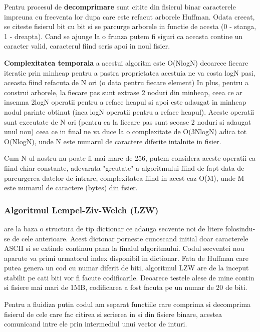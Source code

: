 \documentclass[runningheads]{llncs}
\begin{document}
Pentru procesul de \textbf{decomprimare} sunt citite din fisierul binar caracterele impreuna cu frecventa lor dupa care este refacut arborele
Huffman. Odata creeat, se citeste fisierul bit cu bit si se parcurge arborele in functie de acesta (0 - stanga, 1 - dreapta).
Cand se ajunge la o frunza putem fi siguri ca aceasta contine un caracter valid, caracterul fiind scris apoi in noul fisier.

\textbf{Complexitatea temporala} a acestui algoritm este O(NlogN) deoarece fiecare iteratie prin minheap pentru a pastra proprietatea
acestuia ne va costa logN pasi, aceasta fiind refacuta de N ori (o data pentru fiecare element)
In plus, pentru a construi arborele, la fiecare pas sunt extrase 2 noduri din minheap, ceea ce ar insemna 2logN operatii pentru a reface heapul
si apoi este adaugat in minheap nodul parinte obtinut (inca logN operatii pentru a reface heapul). Aceste operatii sunt executate de N ori (pentru
ca la fiecare pas sunt scoase 2 noduri si adaugat unul nou) ceea ce in final ne va duce la o complexitate de O(3NlogN) adica tot O(NlogN), unde
N este numarul de caractere diferite intalnite in fisier.

Cum N-ul nostru nu poate fi mai mare de 256, putem considera aceste operatii ca fiind chiar constante, adevarata "greutate" a algoritmului fiind de fapt
data de parcurgerea datelor de intrare, complexitatea fiind in acest caz O(M), unde M este numarul de caractere (bytes) din fisier.

\subsubsection{Algoritmul Lempel-Ziv-Welch (LZW)} are la baza o structura de tip dictionar ce adauga secvente noi de litere folosindu-se de cele
anterioare. Acest dictonar porneste cunoscand initial doar caracterele ASCII si se extinde continuu pana la finalul algoritmului.
Codul secventei nou aparute va primi urmatorul index disponibil in dictionar. Fata de Huffman care putea
genera un cod cu numar diferit de biti, algoritmul LZW are de la inceput stabilit pe cati biti vor fi facute codificarile. Deoarece testele alese de mine contin
si fisiere mai mari de 1MB, codificarea a fost facuta pe un numar de 20 de biti.

Pentru a fluidiza putin codul am separat functiile care comprima si decomprima fisierul de cele care fac citirea si scrierea in si din
fisiere binare, acestea comunicand intre ele prin intermediul unui vector de inturi.
\end{document}
